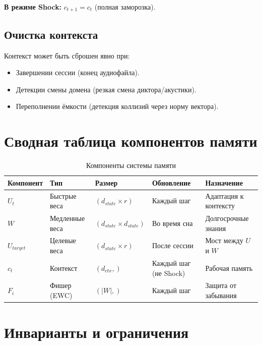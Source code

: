 \textbf{В режиме Shock:} $c_{t+1} = c_t$ (полная заморозка).

\subsection{Очистка контекста}

Контекст может быть сброшен явно при:
\begin{itemize}
    \item Завершении сессии (конец аудиофайла).
    \item Детекции смены домена (резкая смена диктора/акустики).
    \item Переполнении ёмкости (детекция коллизий через норму вектора).
\end{itemize}

\section{Сводная таблица компонентов памяти}

\begin{table}[h]
\centering
\caption{Компоненты системы памяти}
\label{tab:memory_components}
\begin{tabular}{lp{3cm}p{2.5cm}p{3cm}p{3.5cm}}
\toprule
\textbf{Компонент} & \textbf{Тип} & \textbf{Размер} & \textbf{Обновление} & \textbf{Назначение} \\
\midrule
$U_t$ & Быстрые веса & $(d_{state} \times r)$ & Каждый шаг & Адаптация к контексту \\
$W$ & Медленные веса & $(d_{state} \times d_{state})$ & Во время сна & Долгосрочные знания \\
$U_{target}$ & Целевые веса & $(d_{state} \times r)$ & После сессии & Мост между $U$ и $W$ \\
$c_t$ & Контекст & $(d_{ctx},)$ & Каждый шаг (не Shock) & Рабочая память \\
$F_i$ & Фишер (EWC) & $(|W|,)$ & Каждый шаг & Защита от забывания \\
\bottomrule
\end{tabular}
\end{table}

\section{Инварианты и ограничения}

